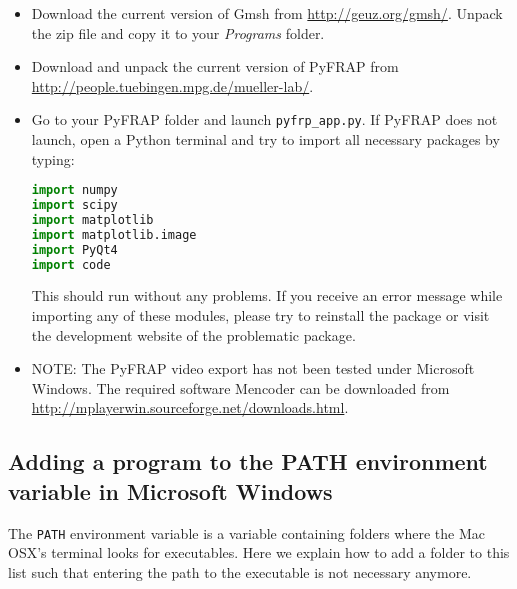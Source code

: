 \documentclass[a4paper,11pt]{article}
\begin{document}
\begin{itemize}
\item  Download the current version of Gmsh from \url{http://geuz.org/gmsh/}. Unpack the zip file and copy it to your \textit{Programs} folder.
\item  Download and unpack the current version of PyFRAP from \url{http://people.tuebingen.mpg.de/mueller-lab/}.
\item Go to your PyFRAP folder and launch \verb+pyfrp_app.py+. If PyFRAP does not launch, open a Python terminal and try to import all necessary packages by typing:
\begin{lstlisting}[frame=single,language=Python]  
import numpy
import scipy
import matplotlib
import matplotlib.image
import PyQt4
import code
\end{lstlisting}

This should run without any problems. If you receive an error message while importing any of these modules, please try to reinstall the package or visit the development website of the problematic package.


\item NOTE: The PyFRAP video export has not been tested under Microsoft Windows. The required software Mencoder can be downloaded from \url{http://mplayerwin.sourceforge.net/downloads.html}.
\end{itemize}

\subsection{Adding a program to the PATH environment variable in Microsoft Windows}
\label{sec:pathosx}
The \verb+PATH+ environment variable is a variable containing folders where the Mac OSX's terminal looks for executables. Here we explain how to add a folder to this list such that entering the path
to the executable is not necessary anymore. 
\end{document}
